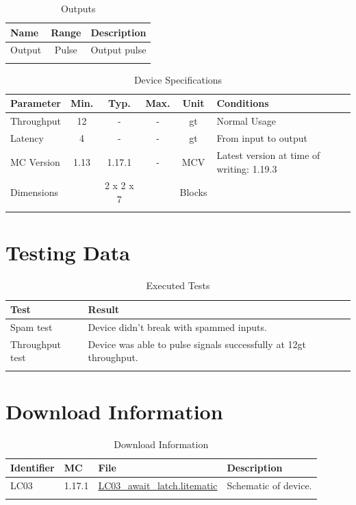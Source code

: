 \documentclass[10pt]{datasheet}
\begin{document}
\begin{table}[h]
    \caption{Outputs}
    \begin{tabularx}{\textwidth}{l | c | X}
        \thickhline
        \textbf{Name} & \textbf{Range} & \textbf{Description} \\
        \hline
        Output & Pulse & Output pulse \\
        \thickhline
\end{tabularx}
\end{table}

\begin{table}[h]
    \caption{Device Specifications}
    \begin{tabularx}{\textwidth}{l | c c c | c | X}
        \thickhline
        \textbf{Parameter} & \textbf{Min.} & \textbf{Typ.} & \textbf{Max.} &
        \textbf{Unit} & \textbf{Conditions} \\
        \hline
        Throughput  & 12 & - & - & gt & Normal Usage \\
        \hline
        Latency    & 4 & - & - & gt & From input to output \\
        \hline
        MC Version & 1.13 & 1.17.1 & - & MCV & Latest version at time of writing: 1.19.3\\
        \hline
        Dimensions & & 2 x 2 x 7 & & Blocks & \\
        \thickhline
\end{tabularx}
\end{table}
\newpage
\section{Testing Data}
\begin{table}[h]
\caption{Executed Tests}
\begin{tabularx}{\textwidth}{l | X}
    \thickhline
    \textbf{Test} & \textbf{Result} \\
    \hline
    Spam test & Device didn't break with spammed inputs. \\
    \hline
    Throughput test & Device was able to pulse signals successfully at 12gt throughput. \\
    \thickhline
\end{tabularx}
\end{table}

\section{Download Information}
\begin{table}[h]
    \caption{Download Information}
    \begin{tabularx}{\textwidth}{l | l | l | X}
        \thickhline
        \textbf{Identifier} & \textbf{MC} & \textbf{File} & \textbf{Description} \\
        \hline
        LC03 & 1.17.1 & \href{https://github.com/Soontech-Annals/Archive/blob/92d3541e07ddc3ab90360e923907f040eca76834/Archive/logic-and-computation/LC03\%20Await\%20Latch/LC03\_await\_latch.litematic?raw=1}{LC03\_await\_latch.litematic} & Schematic of device. \\
        \hline
        \thickhline
    \end{tabularx}
\end{table}
\end{document}
